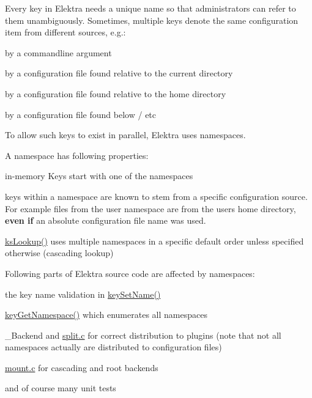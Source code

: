Every key in Elektra needs a unique name so that administrators can refer to them unambiguously. Sometimes, multiple keys denote the same configuration item from different sources, e.\+g.\+:


\begin{DoxyItemize}
\item by a commandline argument
\item by a configuration file found relative to the current directory
\item by a configuration file found relative to the home directory
\item by a configuration file found below {\ttfamily /} etc
\end{DoxyItemize}

To allow such keys to exist in parallel, Elektra uses namespaces.

A namespace has following properties\+:


\begin{DoxyItemize}
\item in-\/memory Keys start with one of the namespaces
\item keys within a namespace are known to stem from a specific configuration source. For example files from the {\ttfamily user} namespace are from the users home directory, {\bfseries{even if}} an absolute configuration file name was used.
\item {\ttfamily \mbox{\hyperlink{group__keyset_gaa34fc43a081e6b01e4120daa6c112004}{ks\+Lookup()}}} uses multiple namespaces in a specific default order unless specified otherwise (cascading lookup)
\end{DoxyItemize}

Following parts of Elektra source code are affected by namespaces\+:


\begin{DoxyItemize}
\item the key name validation in {\ttfamily \mbox{\hyperlink{group__keyname_ga7699091610e7f3f43d2949514a4b35d9}{key\+Set\+Name()}}}
\item {\ttfamily \mbox{\hyperlink{group__keyname_gafc3ca03ed10f87eb59bdc02cf2a0de8d}{key\+Get\+Namespace()}}} which enumerates all namespaces
\item {\ttfamily \+\_\+\+Backend} and {\ttfamily \mbox{\hyperlink{split_8c}{split.\+c}}} for correct distribution to plugins (note that not all namespaces actually are distributed to configuration files)
\item {\ttfamily \mbox{\hyperlink{mount_8c}{mount.\+c}}} for cascading and root backends
\item and of course many unit tests
\end{DoxyItemize}

